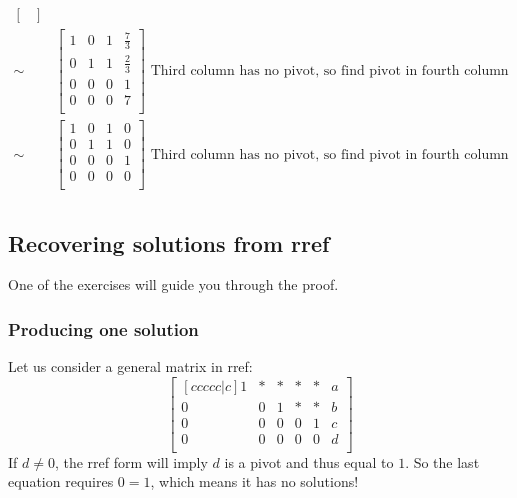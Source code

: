 \begin{align*}
\begin{bmatrix}
	\end{bmatrix} \\
	\sim & \begin{bmatrix}
		1&0& 1 & \frac{7}{3}\\
		0&1&1&\frac{2}{3}\\
		0&0&0&1\\
		0& 0&0 & 7\\
	\end{bmatrix} \textrm{ Third column has no pivot, so find pivot in fourth column}\\
	\sim & \begin{bmatrix}
		1&0& 1 & 0\\
		0&1&1&0\\
		0&0&0&1\\
		0& 0&0 & 0\\
	\end{bmatrix} \textrm{ Third column has no pivot, so find pivot in fourth column}\\
\end{align*}
\endgroup 
\subsection{Recovering solutions from rref}
One of the exercises will guide you through the proof.
\subsubsection*{Producing one solution}
Let us consider a general matrix in rref:\[
	\begin{bmatrix}[c c c c c|c]
		1& *& * &* &*& a\\
		0& 0 & 1 &* &*& b\\
		0& 0 & 0 &0 &1& c\\
		0& 0& 0 & 0 &0& d\\
	\end{bmatrix}
\]
If $d\neq0$, the rref form will imply $d$ is a pivot and thus equal to $1$.
So the last equation requires $0=1$, which means it has no solutions!

